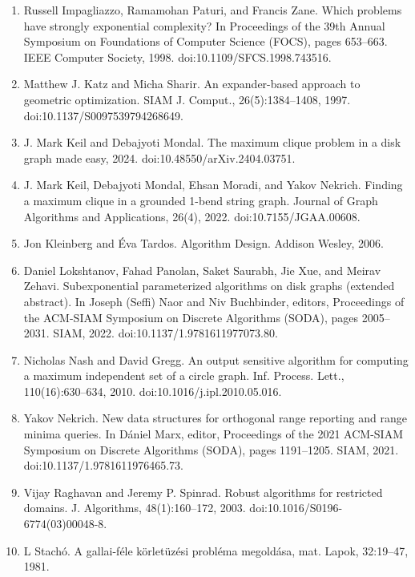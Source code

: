 \documentclass[10pt,a4paper]{amsart}
\begin{document}
\begin{enumerate}
\item[]  [30]  Russell Impagliazzo, Ramamohan Paturi, and Francis Zane.  Which problems have strongly exponential complexity?  In Proceedings of the 39th Annual Symposium on Foundations of Computer Science (FOCS), pages 653–663. IEEE Computer Society, 1998.  doi:10.1109/SFCS.1998.743516.  
\item[]  [31]  Matthew J. Katz and Micha Sharir.  An expander-based approach to geometric optimization.  SIAM J. Comput., 26(5):1384–1408, 1997.  doi:10.1137/S0097539794268649.  
\item[]  [32]  J. Mark Keil and Debajyoti Mondal.  The maximum clique problem in a disk graph made easy, 2024.  doi:10.48550/arXiv.2404.03751.  
\item[]  [33]  J. Mark Keil, Debajyoti Mondal, Ehsan Moradi, and Yakov Nekrich.  Finding a maximum clique in a grounded 1-bend string graph.  Journal of Graph Algorithms and Applications, 26(4), 2022.  doi:10.7155/JGAA.00608.  
\item[]  [34]  Jon Kleinberg and Éva Tardos.  Algorithm Design.  Addison Wesley, 2006.  
\item[]  [35]  Daniel Lokshtanov, Fahad Panolan, Saket Saurabh, Jie Xue, and Meirav Zehavi.  Subexponential parameterized algorithms on disk graphs (extended abstract).  In Joseph (Seffi) Naor and Niv Buchbinder, editors, Proceedings of the ACM-SIAM Symposium on Discrete Algorithms (SODA), pages 2005–2031. SIAM, 2022.  doi:10.1137/1.9781611977073.80.  
\item[]  [36]  Nicholas Nash and David Gregg.  An output sensitive algorithm for computing a maximum independent set of a circle graph.  Inf. Process. Lett., 110(16):630–634, 2010.  doi:10.1016/j.ipl.2010.05.016.  
\item[]  [37]  Yakov Nekrich.  New data structures for orthogonal range reporting and range minima queries.  In Dániel Marx, editor, Proceedings of the 2021 ACM-SIAM Symposium on Discrete Algorithms (SODA), pages 1191–1205. SIAM, 2021.  doi:10.1137/1.9781611976465.73.  
\item[]  [38]  Vijay Raghavan and Jeremy P. Spinrad.  Robust algorithms for restricted domains.  J. Algorithms, 48(1):160–172, 2003.  doi:10.1016/S0196-6774(03)00048-8.  
\item[]  [39]  L Stachó.  A gallai-féle körletüzési probléma megoldása, mat.  Lapok, 32:19–47, 1981.  
\end{enumerate}
\par
\end{document}

